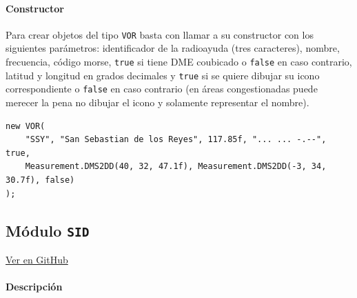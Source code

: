 \paragraph{Constructor} \phantom{\newline}

Para crear objetos del tipo \texttt{VOR} basta con llamar a su constructor con los siguientes parámetros: identificador de la radioayuda (tres caracteres), nombre, frecuencia, código morse, \texttt{true} si tiene DME coubicado o \texttt{false} en caso contrario, latitud y longitud en grados decimales y \texttt{true} si se quiere dibujar su icono correspondiente o \texttt{false} en caso contrario (en áreas congestionadas puede merecer la pena no dibujar el icono y solamente representar el nombre).

\begin{table}[!hbtp]
	\caption{Ejemplo de instancia al constructor de la clase \texttt{VOR}.}
	\label{tab:EjemploVOR}
\end{table}
\vspace{-0.8cm}
\begin{scriptsize}
\begin{Verbatim}[frame=single]
new VOR(
    "SSY", "San Sebastian de los Reyes", 117.85f, "... ... -.--", true, 
    Measurement.DMS2DD(40, 32, 47.1f), Measurement.DMS2DD(-3, 34, 30.7f), false)
);
\end{Verbatim}
\end{scriptsize}









\clearpage

\subsection{Módulo \texttt{SID}}
\label{subsec:ClaseSID}

\vspace{-0.85cm}
\begin{flushright}
\href{https://github.com/macgyver912/atc-simulator/blob/jaime/Assets/Scripts/navaids/SID.cs}{Ver en GitHub \faGithub}
\end{flushright}

\paragraph{Descripción} \phantom{\newline}

